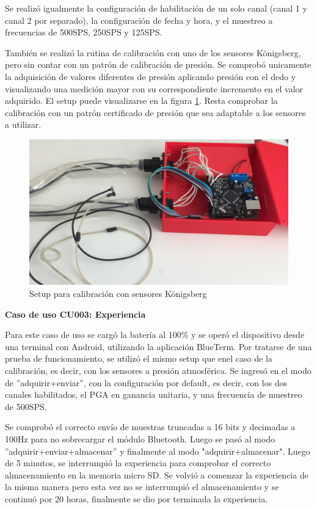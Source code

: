Se realizó igualmente la configuración de habilitación de un solo canal (canal 1 y canal 2 por separado), la configuración de fecha y hora, y el muestreo a frecuencias de 500SPS, 250SPS y 125SPS.

También se realizó la rutina de calibración con uno de los sensores Königsberg, pero sin contar con un patrón de calibración de presión. Se comprobó unicamente la adquisición de valores diferentes de presión aplicando presión con el dedo y visualizando una medición mayor con su correspondiente incremento en el valor adquirido. El setup puede visualizarse en la figura \ref{fig:calibracion}. Resta comprobar la calibración con un patrón certificado de presión que sea adaptable a los sensores a utilizar. 

\begin{figure} [!htpb]
    \centering
    \includegraphics[width=\textwidth]{./Figures/calibracion.jpeg}
    \caption{Setup para calibración con sensores Königsberg}
    \label{fig:calibracion}
\end{figure}

\textbf{Caso de uso CU003: Experiencia}

Para este caso de uso se cargó la batería al 100\% y se operó el dispositivo desde una terminal con Android, utilizando la aplicación BlueTerm. Por tratarse de una prueba de funcionamiento, se utilizó el mismo setup que enel caso de la calibración, es decir, con los sensores a presión atmosférica. Se ingresó en el modo de ''adquirir+enviar'', con la configuración por default, es decir, con los dos canales habilitados, el PGA en ganancia unitaria, y una frecuencia de muestreo de 500SPS. 

Se comprobó el correcto envío de muestras truncadas a 16 bits y decimadas a 100Hz para no sobrecargar el módulo Bluetooth. Luego se pasó al modo ''adquirir+enviar+almacenar'' y finalmente al modo "adquirir+almacenar". Luego de 5 minutos, se interrumpió la experiencia para comprobar el correcto almacenamiento en la memoria micro SD. 
Se volvió a comenzar la experiencia de la misma manera pero esta vez no se interrumpió el almacenamiento y se continuó por 20 horas, finalmente se dio por terminada la experiencia. 

